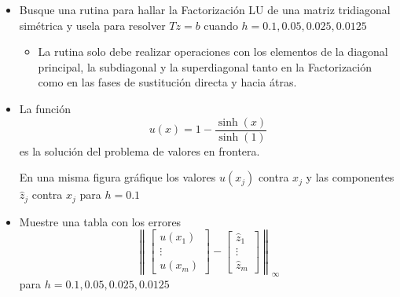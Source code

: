 \documentclass[11pt]{article}
\providecommand{\tightlist}{%
      \setlength{\itemsep}{0pt}\setlength{\parskip}{0pt}}
\begin{document}
    \begin{itemize}
\tightlist
\item
   Busque una rutina para hallar la Factorización LU de una matriz
  tridiagonal simétrica y usela para resolver \(Tz=b\) cuando
  \(h=0.1,0.05,0.025,0.0125\) 
  \begin{itemize}
  \item[]  La rutina solo debe realizar operaciones con los elementos de la
   diagonal principal, la subdiagonal y la superdiagonal tanto en la
    Factorización como en las fases de sustitución directa y hacia átras.
  \end{itemize}
\end{itemize}


    \begin{itemize}
\tightlist
\item
   La función \[u(x)=1-\dfrac{\sinh(x)}{\sinh(1)}\] es la solución del
  problema de valores en frontera. 
  
  En una misma figura gráfique los
  valores \(u(x_j)\) contra \(x_j\) y las componentes \(\widehat z_j\)
  contra \(x_j\) para \(h=0.1\) 
\end{itemize}

    \begin{itemize}
\tightlist
\item
   Muestre una tabla con los errores \[\left\|
    \begin{bmatrix}
    u(x_1) \\ \vdots \\ u(x_m)
   \end{bmatrix} -
   \begin{bmatrix}
    \widehat z_1 \\ \vdots \\ \widehat z_m
   \end{bmatrix}
    \right\|_{\infty}\] para \(h=0.1,0.05,0.025,0.0125\) 
\end{itemize}


    
    
    
    
\end{document}
